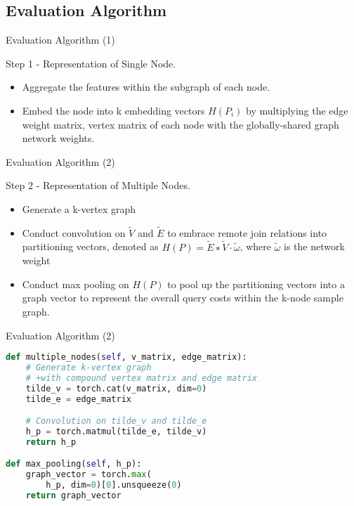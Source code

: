 \documentclass{beamer}
\begin{document}
\subsection{Evaluation Algorithm}
\begin{frame}{Evaluation Algorithm (1)}
    \begin{exampleblock}{Step 1 - Representation of Single Node.}
        \begin{itemize}
            \item Aggregate the features within the subgraph of each node.
            \item Embed the node into k embedding vectors $H(P_i)$ by multiplying the edge weight matrix, vertex matrix of each node with the globally-shared graph network weights.
        \end{itemize}
    \end{exampleblock}
\end{frame}

\begin{frame}{Evaluation Algorithm (2)}
    \begin{exampleblock}{Step 2 - Representation of Multiple Nodes.}
        \begin{itemize}
            \item Generate a k-vertex graph
            \vspace{0.1cm}
            \item Conduct convolution on $\widetilde{V}$ and $\widetilde{E}$ to embrace remote join relations into partitioning vectors, denoted as $H (P) = \widetilde{E} ∗ \widetilde{V} · \widetilde{\omega}$, where $\widetilde{\omega}$ is the network weight
            \vspace{0.1cm}
            \item Conduct max pooling on $H (P)$ to pool up the partitioning vectors into a graph vector to represent the overall query costs within the k-node sample graph.
        \end{itemize}
    \end{exampleblock}
\end{frame}

\begin{frame}[fragile]{Evaluation Algorithm (2)}
    \begin{minipage}{1.04\linewidth}
\begin{lstlisting}[language=python]
def multiple_nodes(self, v_matrix, edge_matrix):
    # Generate k-vertex graph
    # +with compound vertex matrix and edge matrix
    tilde_v = torch.cat(v_matrix, dim=0)
    tilde_e = edge_matrix

    # Convolution on tilde_v and tilde_e
    h_p = torch.matmul(tilde_e, tilde_v)
    return h_p

def max_pooling(self, h_p):
    graph_vector = torch.max(
        h_p, dim=0)[0].unsqueeze(0)
    return graph_vector
\end{lstlisting}
    \end{minipage}
\end{frame}
\end{document}
